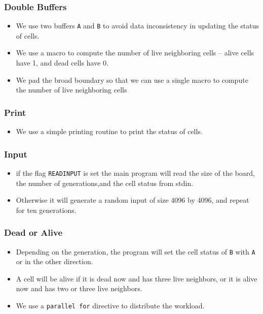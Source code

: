 \documentclass{beamer}
\begin{document}
\begin{frame}
\frametitle{Double Buffers}
\begin{itemize}
\item We use two buffers {\tt A} and {\tt B} to avoid data
  inconsistency in updating the status of cells.
\item We use a macro to compute the number of live neighboring cells
  -- alive cells have 1, and dead cells have 0.
\item We pad the broad boundary so that we can use a single macro to
  compute the number of live neighboring cells
\end{itemize}
\end{frame}

\begin{frame}
\end{frame}

\begin{frame}
\frametitle{Print}
\begin{itemize}
\item We use a simple printing routine to print the status of cells.
\end{itemize}
\end{frame}

\begin{frame}
\end{frame}

\begin{frame}
\frametitle{Input}
\begin{itemize}
\item if the flag {\tt READINPUT} is set the main program will read the
  size of the board, the number of generations,and the cell status
  from stdin.  
\item Otherwise it will generate a random input of size 4096 by 4096,
  and repeat for ten generations.
\end{itemize}
\end{frame}

\begin{frame}
\end{frame}

\begin{frame}
\frametitle{Dead or Alive}
\begin{itemize}
\item Depending on the generation, the program will set the cell status of {\tt B} with {\tt A} or in the other direction.
\item A cell will be alive if it is dead now and has three live neighbors, or it is alive now and has two or three live neighbors.
\item We use a {\tt parallel for} directive to distribute the workload.
\end{itemize}
\end{frame}
\end{document}
